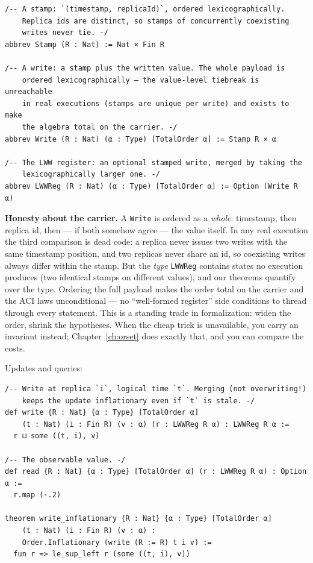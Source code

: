 \documentclass[12pt, a4paper, openright]{book}
\theoremstyle{thmstyle}
\theoremstyle{defstyle}
\newcommand{\lc}[1]{\texttt{#1}}
\newenvironment{notebox}{%
  \begin{tcolorbox}[notebox]%
}{\end{tcolorbox}}
\begin{document}
\begin{verbatim}
/-- A stamp: `(timestamp, replicaId)`, ordered lexicographically.
    Replica ids are distinct, so stamps of concurrently coexisting
    writes never tie. -/
abbrev Stamp (R : Nat) := Nat × Fin R

/-- A write: a stamp plus the written value. The whole payload is
    ordered lexicographically — the value-level tiebreak is unreachable
    in real executions (stamps are unique per write) and exists to make
    the algebra total on the carrier. -/
abbrev Write (R : Nat) (α : Type) [TotalOrder α] := Stamp R × α

/-- The LWW register: an optional stamped write, merged by taking the
    lexicographically larger one. -/
abbrev LWWReg (R : Nat) (α : Type) [TotalOrder α] := Option (Write R α)
\end{verbatim}

\begin{notebox}
  \textbf{Honesty about the carrier.} A \lc{Write} is ordered as a
  \emph{whole}: timestamp, then replica id, then --- if both somehow
  agree --- the value itself. In any real execution the third comparison
  is dead code: a replica never issues two writes with the same
  timestamp position, and two replicas never share an id, so coexisting
  writes always differ within the stamp. But the \emph{type}
  \lc{LWWReg} contains states no execution produces (two identical
  stamps on different values), and our theorems quantify over the type.
  Ordering the full payload makes the order total on the carrier and the
  ACI laws unconditional --- no ``well-formed register'' side conditions
  to thread through every statement. This is a standing trade in
  formalization: widen the order, shrink the hypotheses. When the
  cheap trick is unavailable, you carry an invariant instead;
  Chapter~\ref{ch:orset} does exactly that, and you can compare the
  costs.
\end{notebox}

Updates and queries:

\begin{verbatim}
/-- Write at replica `i`, logical time `t`. Merging (not overwriting!)
    keeps the update inflationary even if `t` is stale. -/
def write {R : Nat} {α : Type} [TotalOrder α]
    (t : Nat) (i : Fin R) (v : α) (r : LWWReg R α) : LWWReg R α :=
  r ⊔ some ((t, i), v)

/-- The observable value. -/
def read {R : Nat} {α : Type} [TotalOrder α] (r : LWWReg R α) : Option α :=
  r.map (·.2)

theorem write_inflationary {R : Nat} {α : Type} [TotalOrder α]
    (t : Nat) (i : Fin R) (v : α) :
    Order.Inflationary (write (R := R) t i v) :=
  fun r => le_sup_left r (some ((t, i), v))
\end{verbatim}
\end{document}
